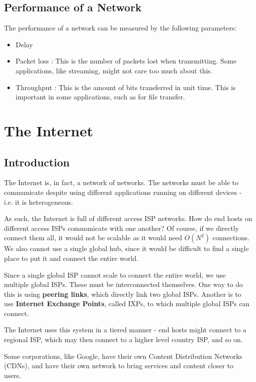 \documentclass[12pt,letterpaper]{amsbook}
\theoremstyle{definition}
\begin{document}
\section{Performance of a Network}

The performance of a network can be measured by the following parameters:

\begin{itemize}
  \item Delay
  \item Packet loss : This is the number of packets lost when transmitting. Some applications, like streaming, might not care too much about this.
  \item Throughput : This is the amount of bits transferred in unit time. This is important in some applications, such as for file transfer. 
\end{itemize}

\chapter{The Internet}

\section{Introduction}

The Internet is, in fact, a network of networks. The networks must be able to communicate despite using different applications running on different devices - i.e. it is heterogeneous.

As such, the Internet is full of different access ISP networks. How do end hosts on different access ISPs communicate with one another? Of course, if we directly connect them all, it would not be scalable as it would need $O(N^2)$ connections. We also cannot use a single global hub, since it would be difficult to find a single place to put it and connect the entire world.

Since a single global ISP cannot scale to connect the entire world, we use multiple global ISPs. These must be interconnected themselves. One way to do this is using \textbf{peering links}, which directly link two global ISPs. Another is to use \textbf{Internet Exchange Points}, called IXPs, to which multiple global ISPs can connect.

The Internet uses this system in a tiered manner - end hosts might connect to a regional ISP, which may then connect to a higher level country ISP, and so on.

Some corporations, like Google, have their own Content Distribution Networks (CDNs), and have their own network to bring services and content closer to users.
\end{document}
